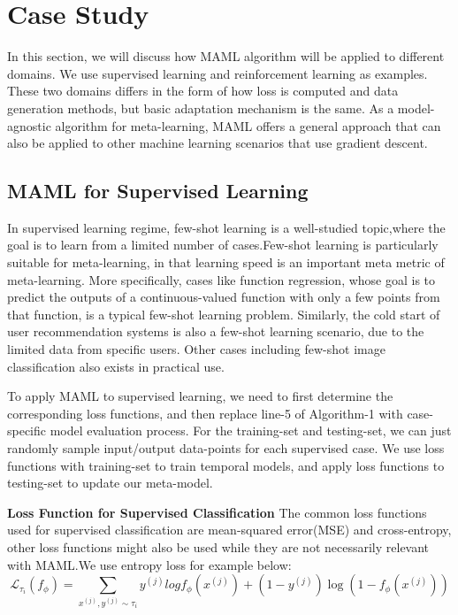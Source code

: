 \section{Case Study}

In this section, we will discuss how MAML algorithm will be applied to different domains. We use supervised learning and reinforcement learning as examples. These two domains differs in the form of how loss is computed and data generation methods, but basic adaptation mechanism is the same. As a model-agnostic algorithm for meta-learning, MAML offers a general approach that can also be applied to other machine learning scenarios that use gradient descent.

\subsection{MAML for Supervised Learning}

In supervised learning regime, few-shot learning is a well-studied topic,where the goal is to learn from a limited number of cases.Few-shot learning is particularly suitable for meta-learning, in that learning speed is an important meta metric of meta-learning. More specifically, cases like function regression, whose goal is to predict the outputs of a continuous-valued function with only a few points from that function, is a typical few-shot learning problem. Similarly, the cold start of user  recommendation systems is also a few-shot learning scenario, due to the limited data from specific users. Other cases including few-shot image classification also exists in practical use.

To apply MAML to supervised learning, we need to first determine the corresponding loss functions, and then replace line-5 of Algorithm-1 with case-specific model evaluation process. For the training-set and testing-set, we can just randomly sample input/output data-points for each supervised case. We use loss functions with training-set to train temporal models, and apply loss functions to testing-set to update our meta-model.

\textbf{Loss Function for Supervised Classification}
The common loss functions used for supervised classification are mean-squared error(MSE) and cross-entropy, other loss functions might also be used while they are not necessarily relevant with MAML.We use entropy loss for example below:
\begin{equation}
    \mathcal{L}_{\tau_i}(f_\phi) = \sum_{x^{(j)},y^{(j)}\sim\tau_i} y^{(j)}log{f_\phi}(x^{(j)}) + (1-y^{(j)})\log(1-f_\phi(x^{(j)}))
    \tag{3}
\end{equation}

